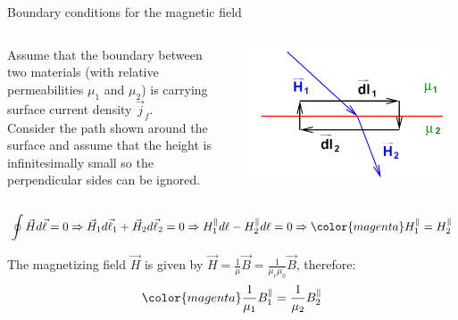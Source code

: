 \begin{frame}{Boundary conditions for the magnetic field}

\begin{columns}
  \begin{column}{0.50\textwidth}
   {\small
     Assume that the boundary between two materials (with relative
     permeabilities $\mu_1$ and  $\mu_2$)
     is carrying surface current density $\vec{j}_f$.\\
     Consider the path shown around the surface and
     assume that the height is infinitesimally small so the perpendicular
     sides can be ignored.
  }
  \end{column}
  \begin{column}{0.50\textwidth}
    \begin{center}
      \includegraphics[width=0.95\textwidth]{./images/schematics/boundary_conditions_magnetic_field_2.png}\\
    \end{center}
  \end{column}
\end{columns}

\begin{equation*}
  \oint \vec{H} d\vec{\ell} = 0 \Rightarrow
     \vec{H}_1 d\vec{\ell}_1 + \vec{H}_2 d\vec{\ell}_2 = 0 \Rightarrow
       H_1^{\parallel} d\ell - H_2^{\parallel} d\ell = 0 \Rightarrow
        {\color{magenta} H_1^{\parallel} = H_2^{\parallel}}
\end{equation*}

The magnetizing field $\vec{H}$ is given by
$\displaystyle \vec{H} = \frac{1}{\mu} \vec{B} = \frac{1}{\mu_r \mu_0} \vec{B}$,
therefore:
\begin{equation*}
        {\color{magenta} \frac{1}{\mu_1}  B_1^{\parallel} = \frac{1}{\mu_2} B_2^{\parallel}}
\end{equation*}

\end{frame}


